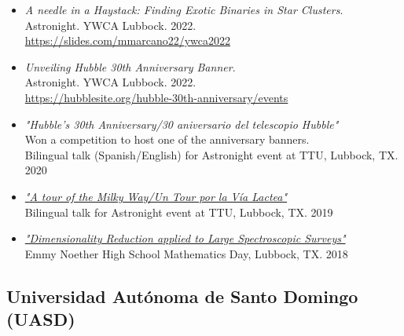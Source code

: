 \documentclass[letterpaper,10pt]{article}
\begin{document}
\begin{itemize}[label=$\blacktriangleright$]

	\item \textit{A needle in a Haystack: Finding Exotic Binaries in Star Clusters}. \\
Astronight. YWCA Lubbock. 2022. \\
\url{https://slides.com/mmarcano22/ywca2022}



	\item \textit{Unveiling Hubble 30th Anniversary Banner}. \\
Astronight. YWCA Lubbock. 2022. \\
\url{https://hubblesite.org/hubble-30th-anniversary/events}



	\item \textit{"Hubble's 30th Anniversary/30 aniversario del telescopio Hubble"} \\ Won a competition to host one of the anniversary banners. \\ Bilingual talk (Spanish/English) for Astronight event at TTU, Lubbock, TX. 2020
	



	\item \textit{\href{https://slides.com/mmarcano22/a-tour-of-the-milky-way-2\#/}{"A tour of the Milky Way/Un Tour por la V\'ia Lactea"}} \\ Bilingual talk for Astronight event at TTU, Lubbock, TX. 2019


	\item \textit{\href{http://manuelpm.me/PCASDSS/}{"Dimensionality Reduction applied to Large Spectroscopic Surveys"}} \\ Emmy Noether High School Mathematics Day, Lubbock, TX. 2018




\end{itemize}


\subsection*{Universidad Aut\'onoma de Santo Domingo (UASD)}
\end{document}
